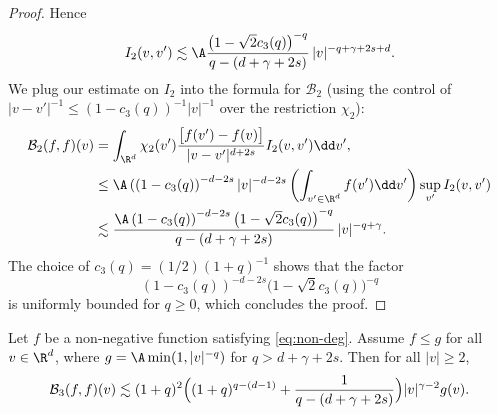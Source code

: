 \begin{proof}
Hence
\[
I_2(v,v') \lesssim \A \frac{\left(1-\sqrt 2 c_3(q)\right)^{-q}}{q-(d+\gamma + 2s)}\, |v|^{-q+\gamma+2s +d}.
\]
We plug our estimate on $I_2$ into the formula for $\mathcal B_2$
(using the control of $|v-v'|^{-1} \le (1-c_3(q))^{-1} |v|^{-1}$ over the
restriction $\chi_2$):
\begin{align*}
\mathcal{B}_2 (f,f)(v) &= \int_{\R^d} \chi_2(v')
\frac{\big[f(v')-f(v)\big]}{|v-v'|^{d+2s}} I_2(v,v') \dd v', \\
&\leq \A \left((1-c_3(q)\right)^{-d-2s} |v|^{-d-2s} \left( \int_{v'\in \R^d} f(v') \dd
v'\right) \sup_{v'} I_2(v,v') \\
& \lesssim \frac{\A \left(1-c_3(q)\right)^{-d-2s} \left(1-\sqrt{2}c_3(q)\right)^{-q}}{q-(d+\gamma + 2s)}\, |v|^{-q+\gamma}.
\end{align*}
The choice of
$c_3(q) = (1/2)(1+q)^{-1}$ shows that the factor
\[
\left(1-c_3(q)\right)^{-d-2s} \bigl(1-\sqrt{2}c_3(q)\bigr)^{-q}
\]
is
uniformly bounded for $q \ge 0$, which concludes the proof.
\end{proof}

\begin{prop} \label{prop:B3} Let $f$ be a non-negative function satisfying \eqref{eq:non-deg}. Assume $f \leq g$ for all $v \in \R^d$, where {$g = \A \min(1,|v|^{-q})$} for
$q> d+\gamma +2s$. Then for all $|v| \ge 2$,
\[ \mathcal{B}_3 (f,f)(v) \lesssim (1+q)^2 \Bigl( (1+q)^{q-(d-1)} +
\frac{1}{q-(d+\gamma+2s)} \Bigr) |v|^{\gamma -2} g(v).\]
\end{prop}


